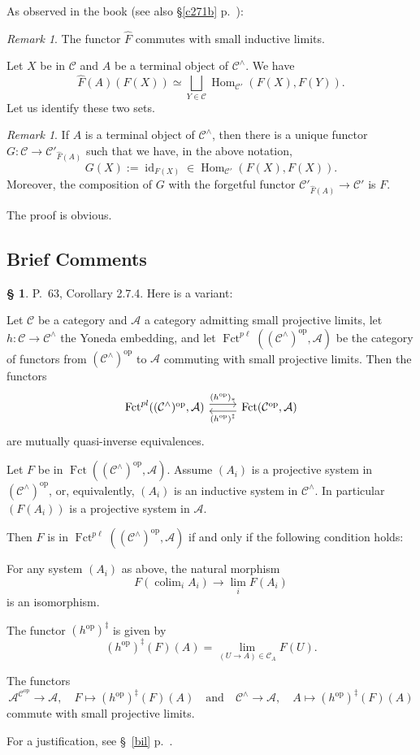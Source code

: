 \documentclass[12pt]{article}
\theoremstyle{remark}
\newtheorem{rk}[thm]{Remark}
\theoremstyle{definition}
\newtheorem{s}[thm]{\S}
\newcommand{\A}{\mathcal A}
\newcommand{\C}{\mathcal C}
\DeclareMathOperator*{\col}{colim}
\DeclareMathOperator{\id}{id}
\DeclareMathOperator{\Fct}{Fct}
\DeclareMathOperator{\Hom}{Hom}
\DeclareMathOperator{\op}{op}
\begin{document}
As observed in the book (see also \S\ref{c271b} p.~\pageref{c271b}):

\begin{rk}\label{272}
The functor $\widehat F$ commutes with small inductive limits.
\end{rk} 

Let $X$ be in $\C$ and $A$ be a terminal object of $\C^\wedge$. We have 
$$
\widehat F(A)(F(X))\simeq\bigsqcup_{Y\in\C}\Hom_{\C'}(F(X),F(Y)).
$$ 
Let us identify these two sets. 

\begin{rk}\label{272b}
If $A$ is a terminal object of $\C^\wedge$, then there is a unique functor $G:\C\to\C'_{\widehat F(A)}$ such that we have, in the above notation, 
$$
G(X):=\id_{F(X)}\in\Hom_{\C'}(F(X),F(X)).
$$ 
Moreover, the composition of $G$ with the forgetful functor $\C'_{\widehat F(A)}\to\C'$ is $F$.
\end{rk} 

The proof is obvious. 


\subsection{Brief Comments} 

\begin{s}\label{opddagg} 
P.~63, Corollary 2.7.4. Here is a variant: 

Let $\C$ be a category and $\A$ a category admitting small projective limits, let $h:\C\to\C^\wedge$ the Yoneda embedding, and let $\Fct^{p\ell}((\C^\wedge)^{\op},\A)$ be the category of functors from $(\C^\wedge)^{\op}$ to $\A$ commuting with small projective limits. Then the functors 
$$
\begin{tikzcd}
\Fct^{pl}((\C^\wedge)^{\op},\A)\ar[yshift=0.7ex]{r}{(h^{\op})_*}&\Fct(\C^{\op},\A)\ar[yshift=-0.7ex]{l}{(h^{\op})^\ddagger}
\end{tikzcd}
$$
are mutually quasi-inverse equivalences. 

Let $F$ be in $\Fct((\C^\wedge)^{\op},\A)$. Assume $(A_i)$ is a projective system in $(\C^\wedge)^{\op}$, or, equivalently, $(A_i)$ is an inductive system in $\C^\wedge$. In particular $(F(A_i))$ is a projective system in $\A$. 

Then $F$ is in $\Fct^{p\ell}((\C^\wedge)^{\op},\A)$ if and only if the following condition holds: 

For any system $(A_i)$ as above, the natural morphism 
$$
F\left(\col_iA_i\right)\to\lim_iF(A_i)
$$ 
is an isomorphism. 

The functor $(h^{\op})^\ddagger$ is given by 
$$ 
(h^{\op})^\ddagger(F)(A)=\lim_{(U\to A)\in\C_A}F(U). 
$$ 

The functors 
$$
\A^{\C^{\op}}\to\A,\quad F\mapsto(h^{\op})^\ddagger(F)(A)\quad\text{and}\quad
\C^\wedge\to\A,\quad A\mapsto(h^{\op})^\ddagger(F)(A)
$$ 
commute with small projective limits. 

For a justification, see \S~\ref{bil} p.~\pageref{bil}.
\end{s}
\end{document}
